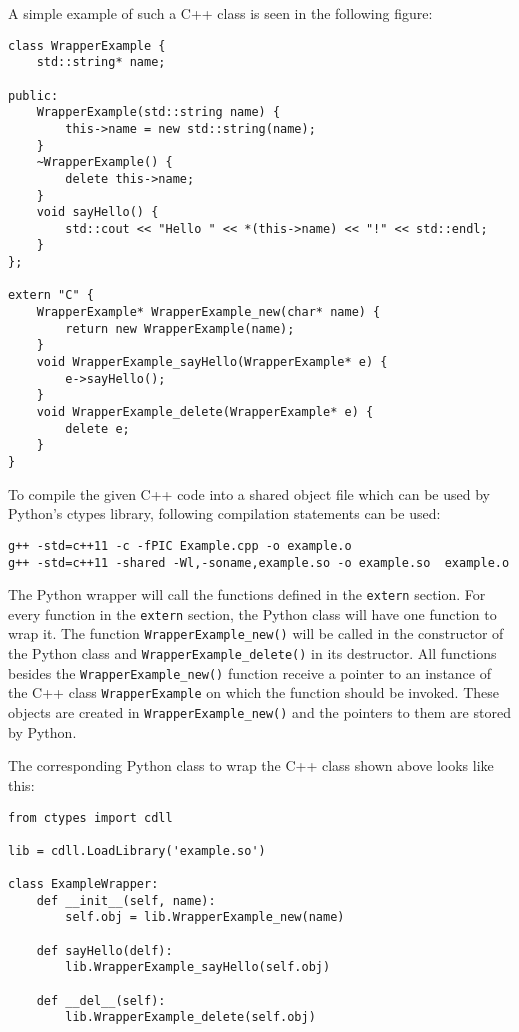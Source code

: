 \documentclass{acm_proc_article-sp}
\begin{document}
A simple example of such a C++ class is seen in the following figure:

\begin{lstlisting}[caption=Example C++ class for wrapping a C++ object in a Python object (Example.cpp)]
class WrapperExample {
    std::string* name;

public:
    WrapperExample(std::string name) {
        this->name = new std::string(name);
    }
    ~WrapperExample() {
        delete this->name;
    }
    void sayHello() {
        std::cout << "Hello " << *(this->name) << "!" << std::endl;
    }
};

extern "C" {
    WrapperExample* WrapperExample_new(char* name) {
        return new WrapperExample(name);
    }
    void WrapperExample_sayHello(WrapperExample* e) {
        e->sayHello();
    }
    void WrapperExample_delete(WrapperExample* e) {
        delete e;
    }
}
\end{lstlisting}

To compile the given C++ code into a shared object file which can be used by Python's ctypes library, following compilation statements can be used:

\lstset{language= bash}
\begin{lstlisting}[caption=Compilation of the C++ class into a shared object file]
g++ -std=c++11 -c -fPIC Example.cpp -o example.o
g++ -std=c++11 -shared -Wl,-soname,example.so -o example.so  example.o
\end{lstlisting}

The Python wrapper will call the functions defined in the \texttt{extern} section. For every function in the \texttt{extern} section, the Python class will have one function to wrap it. The function \texttt{WrapperExample\_new()} will be called in the constructor of the Python class and \texttt{WrapperExample\_delete()} in its  destructor. All functions besides the \texttt{WrapperExample\_new()} function receive a pointer to an instance of the C++ class \texttt{WrapperExample} on which the function should be invoked. These objects are created in \texttt{WrapperExample\_new()} and the pointers to them are stored by Python.

The corresponding Python class to wrap the C++ class shown above looks like this:

\lstset{language=Python}
\begin{lstlisting}[caption=Python class wrapping the C++ class shown above (Example.py)]
from ctypes import cdll

lib = cdll.LoadLibrary('example.so')

class ExampleWrapper:
    def __init__(self, name):
        self.obj = lib.WrapperExample_new(name)

    def sayHello(delf):
        lib.WrapperExample_sayHello(self.obj)

    def __del__(self):
        lib.WrapperExample_delete(self.obj)
\end{lstlisting}
\end{document}

